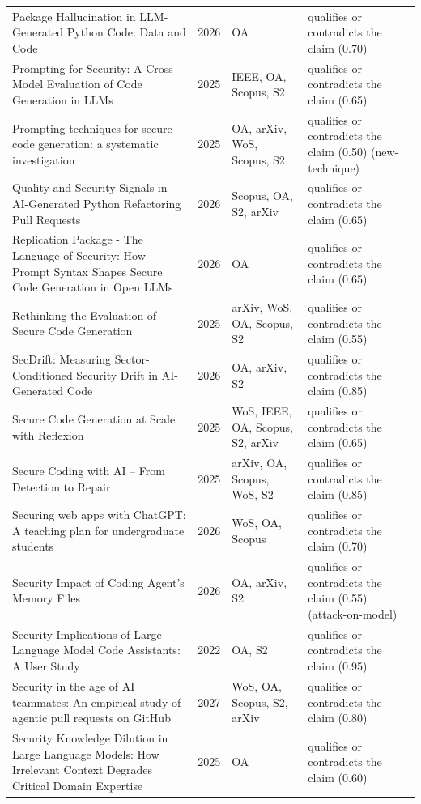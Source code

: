 \begin{longtable}{@{}%
  >{\raggedright\arraybackslash}p{}c%
  >{\raggedright\arraybackslash}p{}%
  >{\raggedright\arraybackslash}p{}@{}}
Package Hallucination in LLM-Generated Python Code: Data and Code & 2026 & OA & qualifies or contradicts the claim (0.70) \\
Prompting for Security: A Cross-Model Evaluation of Code Generation in LLMs & 2025 & IEEE, OA, Scopus, S2 & qualifies or contradicts the claim (0.65) \\
Prompting techniques for secure code generation: a systematic investigation & 2025 & OA, arXiv, WoS, Scopus, S2 & qualifies or contradicts the claim (0.50) (new-technique) \\
Quality and Security Signals in AI-Generated Python Refactoring Pull Requests & 2026 & Scopus, OA, S2, arXiv & qualifies or contradicts the claim (0.65) \\
Replication Package - The Language of Security: How Prompt Syntax Shapes Secure Code Generation in Open LLMs & 2026 & OA & qualifies or contradicts the claim (0.65) \\
Rethinking the Evaluation of Secure Code Generation & 2025 & arXiv, WoS, OA, Scopus, S2 & qualifies or contradicts the claim (0.55) \\
SecDrift: Measuring Sector-Conditioned Security Drift in AI-Generated Code & 2026 & OA, arXiv, S2 & qualifies or contradicts the claim (0.85) \\
Secure Code Generation at Scale with Reflexion & 2025 & WoS, IEEE, OA, Scopus, S2, arXiv & qualifies or contradicts the claim (0.65) \\
Secure Coding with AI -- From Detection to Repair & 2025 & arXiv, OA, Scopus, WoS, S2 & qualifies or contradicts the claim (0.85) \\
Securing web apps with ChatGPT: A teaching plan for undergraduate students & 2026 & WoS, OA, Scopus & qualifies or contradicts the claim (0.70) \\
Security Impact of Coding Agent's Memory Files & 2026 & OA, arXiv, S2 & qualifies or contradicts the claim (0.55) (attack-on-model) \\
Security Implications of Large Language Model Code Assistants: A User Study & 2022 & OA, S2 & qualifies or contradicts the claim (0.95) \\
Security in the age of AI teammates: An empirical study of agentic pull requests on GitHub & 2027 & WoS, OA, Scopus, S2, arXiv & qualifies or contradicts the claim (0.80) \\
Security Knowledge Dilution in Large Language Models: How Irrelevant Context Degrades Critical Domain Expertise & 2025 & OA & qualifies or contradicts the claim (0.60) \\

\end{longtable}
